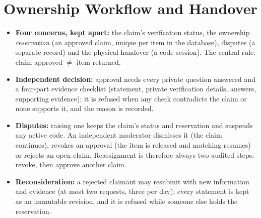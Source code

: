 \documentclass[12pt,a4paper,oneside]{report}
\begin{document}
\section{Ownership Workflow and Handover}\label{sec:handover}
\begin{itemize}
  \item \textbf{Four concerns, kept apart:} the claim's verification status, the ownership \emph{reservation} (an approved claim, unique per item in the database), disputes (a separate record) and the physical handover (a code session). The central rule: claim approved $\neq$ item returned.
  \item \textbf{Independent decision:} approval needs every private question answered and a four-part evidence checklist (statement, private verification details, answers, supporting evidence); it is refused when any check contradicts the claim or none supports it, and the reason is recorded.
  \item \textbf{Disputes:} raising one keeps the claim's status and reservation and suspends any active code. An independent moderator dismisses it (the claim continues), revokes an approval (the item is released and matching resumes) or rejects an open claim. Reassignment is therefore always two audited steps: revoke, then approve another claim.
  \item \textbf{Reconsideration:} a rejected claimant may resubmit with new information and evidence (at most two requests, three per day); every statement is kept as an immutable revision, and it is refused while someone else holds the reservation.
\end{itemize}
\end{document}
